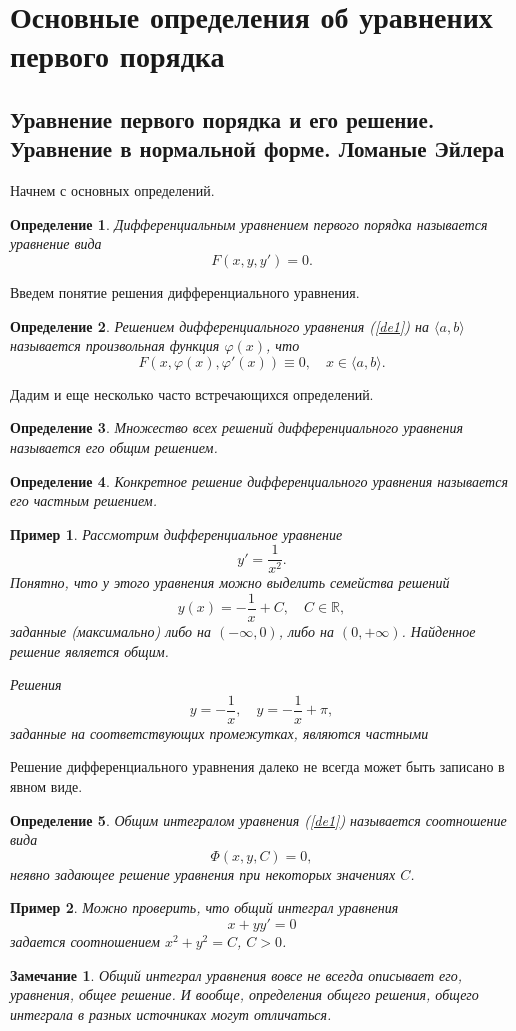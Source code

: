 \documentclass[a4paper,14pt]{extarticle}
\newtheorem{definition}{Определение}[subsection]
\newtheorem{example}{Пример}[subsection]
\newtheorem{remark}{Замечание}[subsection]
\newcommand{\be}{\begin{equation}}
\newcommand{\ee}{\end{equation}}
\newcommand{\la}{\label}
\begin{document}
\section{Основные определения об уравнених первого порядка}
\subsection{Уравнение первого порядка и его решение. Уравнение в нормальной форме. Ломаные Эйлера}
Начнем с основных определений. 
\begin{definition}
Дифференциальным уравнением первого порядка называется уравнение вида
\be\la{de1}
F(x, y, y') = 0.
\ee
\end{definition}
Введем понятие решения дифференциального уравнения.
\begin{definition}
Решением дифференциального уравнения (\ref{de1}) на $\langle a, b \rangle$ называется произвольная функция $\varphi(x)$, что
$$
F(x, \varphi(x), \varphi'(x)) \equiv 0, \quad x \in \langle a, b \rangle.
$$
\end{definition}
Дадим и еще несколько часто встречающихся определений.
\begin{definition}
Множество всех решений дифференциального уравнения называется его общим решением.	
\end{definition}
\begin{definition}
Конкретное решение дифференциального уравнения называется его частным решением.	
\end{definition}
\begin{example}
Рассмотрим дифференциальное уравнение
$$
y' = \frac{1}{x^2}.
$$
Понятно, что у этого уравнения можно выделить семейства решений
$$
y(x) = -\frac{1}{x} + C, \quad C \in \mathbb R,
$$
заданные (максимально) либо на $(-\infty, 0)$, либо на $(0, +\infty)$. Найденное решение является общим.

Решения
$$
y = -\frac{1}{x}, \quad y = -\frac{1}{x} + \pi,
$$
заданные на соответствующих промежутках, являются частными
\end{example}
Решение дифференциального уравнения далеко не всегда может быть записано в явном виде.
\begin{definition}
Общим интегралом уравнения (\ref{de1}) называется соотношение вида
$$
\Phi(x, y, C) = 0,
$$
неявно задающее решение уравнения при некоторых значениях $C$.
\end{definition}
\begin{example}
Можно проверить, что общий интеграл уравнения 
$$
x + yy' = 0
$$
задается соотношением $x^2 + y^2 = C$, $C > 0$.
\end{example}
\begin{remark}
Общий интеграл уравнения вовсе не всегда описывает его, уравнения, общее решение. И вообще, определения общего решения, общего интеграла в разных источниках могут отличаться.
\end{remark}
\end{document}
